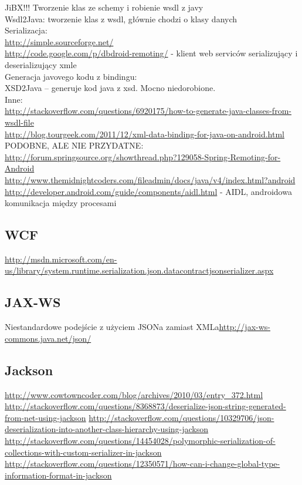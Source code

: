 \documentclass[twoside,a4paper]{book}
\begin{document}
JiBX!!! Tworzenie klas ze schemy i robienie wsdl z javy\\
Wsdl2Java: tworzenie klas z wsdl, głównie chodzi o klasy danych\\

Serializacja:\\
\url{http://simple.sourceforge.net/}\\
\url{http://code.google.com/p/dbdroid-remoting/} - klient web serviców serializujący i deserializujący xmle\\
Generacja javovego kodu z bindingu:\\
XSD2Java – generuje kod java z xsd. Mocno niedorobione.\\
Inne:\\
\url{http://stackoverflow.com/questions/6920175/how-to-generate-java-classes-from-wsdl-file}\\
\url{http://blog.tourgeek.com/2011/12/xml-data-binding-for-java-on-android.html}\\
PODOBNE, ALE NIE PRZYDATNE:\\

\url{http://forum.springsource.org/showthread.php?129058-Spring-Remoting-for-Android}\\
\url{http://www.themidnightcoders.com/fileadmin/docs/java/v4/index.html?android}\\
\url{http://developer.android.com/guide/components/aidl.html} - AIDL, androidowa komunikacja między procesami\\


\subsection{WCF}
\url{http://msdn.microsoft.com/en-us/library/system.runtime.serialization.json.datacontractjsonserializer.aspx}\\

\subsection{JAX-WS}
Niestandardowe podejście z użyciem JSONa zamiast XMLa\url{http://jax-ws-commons.java.net/json/}\\

\subsection{Jackson}
\url{http://www.cowtowncoder.com/blog/archives/2010/03/entry_372.html}\\
\url{http://stackoverflow.com/questions/8368873/deserialize-json-string-generated-from-net-using-jackson}
\url{http://stackoverflow.com/questions/10329706/json-deserialization-into-another-class-hierarchy-using-jackson}
\url{http://stackoverflow.com/questions/14454028/polymorphic-serialization-of-collections-with-custom-serializer-in-jackson}
\url{http://stackoverflow.com/questions/12350571/how-can-i-change-global-type-information-format-in-jackson}
\end{document}
